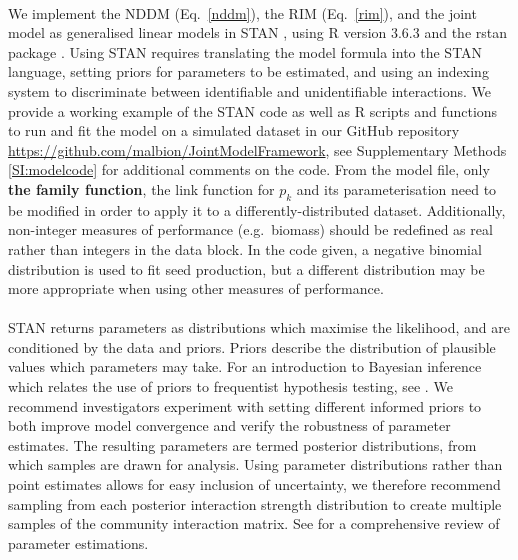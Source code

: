 \documentclass[a4,12pt]{article}
\begin{document}
\begin{refsection}
        \paragraph{}        
        We implement the NDDM (Eq.~\ref{nddm}), the RIM (Eq.~\ref{rim}), and the joint model as generalised linear models in STAN \parencite{Carpenter2017}, using R version 3.6.3 \parencite{R2020} and the rstan package \parencite{Rstan2020}. Using STAN requires translating the model formula into the STAN language, setting priors for parameters to be estimated, and using an indexing system to discriminate between identifiable and unidentifiable interactions. We provide a working example of the STAN code as well as R scripts and functions to run and fit the model on a simulated dataset in our GitHub repository \url{https://github.com/malbion/JointModelFramework}, see Supplementary Methods \ref{SI:modelcode} for additional comments on the code.
        From the model file, only \textbf{the family function}, the link function for $p_k$ and its parameterisation need to be modified in order to apply it to a differently-distributed dataset. Additionally, non-integer measures of performance (e.g.\ biomass) should be redefined as real rather than integers in the data block. In the code given, a negative binomial distribution is used to fit seed production, but a different distribution may be more appropriate when using other measures of performance.   
        \paragraph{}
        STAN returns parameters as distributions which maximise the likelihood, and are conditioned by the data and priors. Priors describe the distribution of plausible values which parameters may take. For an introduction to Bayesian inference which relates the use of priors to frequentist hypothesis testing, see \textcite{Ellison1996}. We recommend investigators experiment with setting different informed priors to both improve model convergence and verify the robustness of parameter estimates. The resulting parameters are termed posterior distributions, from which samples are drawn for analysis. Using parameter distributions rather than point estimates allows for easy inclusion of uncertainty, we therefore recommend sampling from each posterior interaction strength distribution to create multiple samples of the community interaction matrix. See \textcite{Ellison2004} for a comprehensive review of parameter estimations.


\end{refsection}
\end{document}
